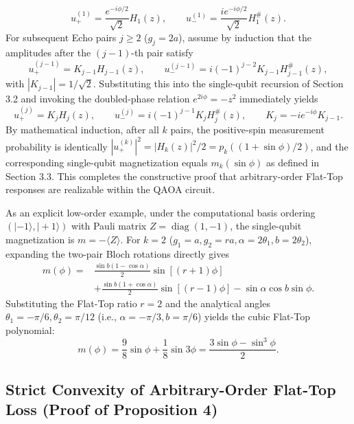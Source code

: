 \documentclass{article}
\theoremstyle{plain}
\theoremstyle{definition}
\begin{document}
\[
u_+^{(1)}=\frac{e^{-i\phi/2}}{\sqrt2}H_1(z),\qquad
u_-^{(1)}=\frac{i e^{-i\phi/2}}{\sqrt2}H_1^\#(z).
\]
For subsequent Echo pairs $j\ge 2$ ($g_j=2a$), assume by induction that the amplitudes after the $(j-1)$-th pair satisfy
\[
u_+^{(j-1)}=K_{j-1}H_{j-1}(z),\qquad
u_-^{(j-1)}=i(-1)^{j-2}K_{j-1}H_{j-1}^\#(z),
\]
with $|K_{j-1}|=1/\sqrt2$. Substituting this into the single-qubit recursion of Section 3.2 and invoking the doubled-phase relation $e^{2i\phi}=-z^2$ immediately yields
\[
u_+^{(j)}=K_jH_j(z),\qquad
u_-^{(j)}=i(-1)^{j-1}K_jH_j^\#(z),\qquad
K_j=-ie^{-i\phi}K_{j-1}.
\]
By mathematical induction, after all $k$ pairs, the positive-spin measurement probability is identically $|u_+^{(k)}|^2=|H_k(z)|^2/2=p_k((1+\sin\phi)/2)$, and the corresponding single-qubit magnetization equals $m_k(\sin\phi)$ as defined in Section 3.3. This completes the constructive proof that arbitrary-order Flat-Top responses are realizable within the QAOA circuit.

As an explicit low-order example, under the computational basis ordering $(|-1\rangle,|+1\rangle)$ with Pauli matrix $Z=\operatorname{diag}(1,-1)$, the single-qubit magnetization is $m=-\langle Z\rangle$. For $k=2$ ($g_1=a, g_2=ra, \alpha=2\theta_1, b=2\theta_2$), expanding the two-pair Bloch rotations directly gives
\[
\begin{aligned}
m(\phi)
={}&\frac{\sin b(1-\cos\alpha)}2\sin[(r+1)\phi]\\
&+\frac{\sin b(1+\cos\alpha)}2\sin[(r-1)\phi]
-\sin\alpha\cos b\sin\phi.
\end{aligned}
\]
Substituting the Flat-Top ratio $r=2$ and the analytical angles $\theta_1=-\pi/6, \theta_2=\pi/12$ (i.e., $\alpha=-\pi/3, b=\pi/6$) yields the cubic Flat-Top polynomial:
\[
m(\phi)=\frac98\sin\phi+\frac18\sin3\phi
=\frac{3\sin\phi-\sin^3\phi}{2}.
\]
\subsection{Strict Convexity of Arbitrary-Order Flat-Top Loss (Proof of Proposition 4)}\label{subsec:a_3}
\end{document}
